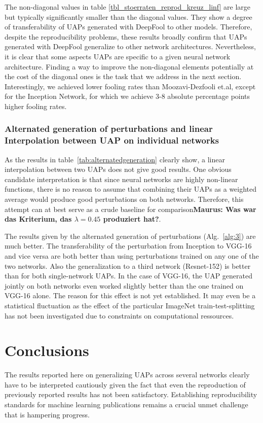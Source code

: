 \documentclass[runningheads]{llncs}
\begin{document}
The non-diagonal values in table \ref{tbl_stoerraten_reprod_kreuz_linf} are large but typically significantly smaller than the diagonal values. They show a degree of transferability of UAPs generated with DeepFool to other models. Therefore, despite the reproducibility problems, these results broadly confirm that UAPs generated with DeepFool generalize to other network architectures. Nevertheless, it is clear that some aspects UAPs are specific to a given neural network architecture. Finding a way to improve the non-diagonal elements potentially at the cost of the diagonal ones is the task that we address in the next section.
Interestingly, we achieved lower fooling rates than Moozavi-Dezfooli et.al, except for the Inception Network, for which we achieve 3-8 absolute percentage points higher fooling rates.

\subsubsection{Alternated generation of perturbations and linear Interpolation between UAP on individual networks}
As the results in table~\ref{tab:alternatedgeneration} clearly show, a linear interpolation between two UAPs does not give good results. One obvious candidate interpretation is that since neural networks are highly non-linear functions, there is no reason to assume that combining their UAPs as a weighted average would produce good perturbations on both networks. Therefore, this attempt can at best serve as a crude baseline for comparison{\bf Maurus: Was war das Kriterium, das $\lambda=0.45$ produziert hat?}. 

The results given by the alternated generation of perturbations (Alg.~\ref{alg:3}) are much better. The transferability of the perturbation from Inception to VGG-16 and vice versa are both better than using perturbations trained on any one of the two networks. Also the generalization to a third network (Resnet-152) is better than for both single-network UAPs. In the case of VGG-16, the UAP generated jointly on both networks even worked slightly better than the one trained on VGG-16 alone. The reason for this effect is not yet established. It may even be a statistical fluctuation as the effect of the particular ImageNet train-test-splitting has not been investigated due to constraints on computational ressources. 

\section{Conclusions}
The results reported here on generalizing UAPs across several networks clearly have to be interpreted cautiously given the fact that even the reproduction of previously reported results has not been satisfactory. Establishing reproducibility standards for machine learning publications remains a crucial unmet challenge that is hampering progress.
\end{document}
